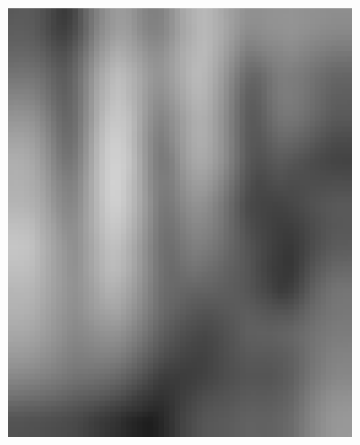 \begin{figure}[h!]
\begin{subfigure}{0.22\textwidth}
		\includegraphics[width=\linewidth]{Images/KDDProcess/seventhFilter}
		\caption{}    %
		\label{subfig:seventhFilter}
	\end{subfigure}
	\hfill
	\begin{subfigure}{0.22\textwidth}

\end{subfigure}
\end{figure}
